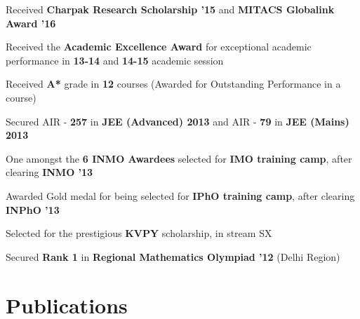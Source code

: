 \documentclass[a4paper]{norm-resume}
\begin{document}
\begin{tightitemize}
	\item Received \textbf{Charpak Research Scholarship '15} and \textbf{MITACS Globalink Award '16}
	\item Received the \textbf{Academic Excellence Award} for exceptional academic performance in \textbf{13-14} and \textbf{14-15} academic session
	\item Received \textbf{A*} grade in \textbf{12} courses (Awarded for Outstanding Performance in a course)
	\item Secured AIR - \textbf{257} in {\textbf{JEE (Advanced) 2013}} and AIR - {\textbf{79}} in \textbf{JEE (Mains) 2013}
	\item One amongst the \textbf{6 INMO Awardees} selected for \textbf{IMO training camp}, after clearing \textbf{INMO '13}
	\item Awarded Gold medal for being selected for \textbf{IPhO training camp}, after clearing \textbf{INPhO '13}
	\item Selected for the prestigious \textbf{KVPY} scholarship, in stream SX
	\item Secured \textbf{Rank 1} in \textbf{Regional Mathematics Olympiad '12} (Delhi Region)		
\end{tightitemize}
	
\vspace{0mm}	%


\section{Publications \hrulefill}
		
\vspace{2mm} %

\descript{}

\vspace{2mm} %

\end{document}
